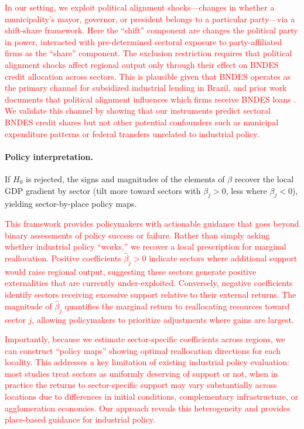 \documentclass{article}
\begin{document}
\textcolor{red}{In our setting, we exploit political alignment shocks---changes in whether a municipality's mayor, governor, or president belongs to a particular party---via a shift-share framework. Here the ``shift'' component are changes the political party in power, interacted with pre-determined sectoral exposure to party-affiliated firms as the ``share'' component. The exclusion restriction requires that political alignment shocks affect regional output only through their effect on BNDES credit allocation across sectors. This is plausible given that BNDES operates as the primary channel for subsidized industrial lending in Brazil, and prior work documents that political alignment influences which firms receive BNDES loans \citep{lazzarini2015state, carvalho2014real}. We validate this channel by showing that our instruments predict sectoral BNDES credit shares but not other potential confounders such as municipal expenditure patterns or federal transfers unrelated to industrial policy.}



\paragraph{Policy interpretation.}
If $H_0$ is rejected, the signs and magnitudes of the elements of $\beta$ recover the local GDP gradient by sector
(tilt more toward sectors with $\beta_j>0$, less where $\beta_j<0$), yielding sector-by-place policy maps.

\textcolor{red}{This framework provides policymakers with actionable guidance that goes beyond binary assessments of policy success or failure. Rather than simply asking whether industrial policy ``works,'' we recover a local prescription for marginal reallocation. Positive coefficients $\hat{\beta}_j > 0$ indicate sectors where additional support would raise regional output, suggesting these sectors generate positive externalities that are currently under-exploited. Conversely, negative coefficients identify sectors receiving excessive support relative to their external returns. The magnitude of $\hat{\beta}_j$ quantifies the marginal return to reallocating resources toward sector $j$, allowing policymakers to prioritize adjustments where gains are largest.}

\textcolor{red}{Importantly, because we estimate sector-specific coefficients across regions, we can construct ``policy maps'' showing optimal reallocation directions for each locality. This addresses a key limitation of existing industrial policy evaluation: most studies treat sectors as uniformly deserving of support or not, when in practice the returns to sector-specific support may vary substantially across locations due to differences in initial conditions, complementary infrastructure, or agglomeration economies. Our approach reveals this heterogeneity and provides place-based guidance for industrial policy.}
\end{document}
